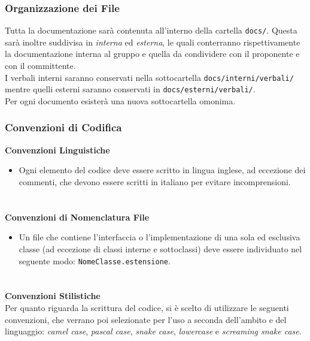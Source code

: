 \documentclass[a4paper, 12pt]{article}
\begin{document}
\subsubsection{Organizzazione dei File}
Tutta la documentazione sarà contenuta all'interno della cartella \texttt{docs/}. Questa sarà inoltre suddivisa in \textit{interna} ed \textit{esterna}, le quali conterranno rispettivamente la documentazione interna al gruppo e quella da condividere con il proponente e con il committente. \\
I verbali interni saranno conservati nella sottocartella \texttt{docs/interni/verbali/} mentre quelli esterni saranno conservati in \texttt{docs/esterni/verbali/}.\\
Per ogni documento esisterà una nuova sottocartella omonima.

\subsubsection{Convenzioni di Codifica}
\textbf{Convenzioni Linguistiche} \newline
\begin{itemize}
    \item Ogni elemento del codice deve essere scritto in lingua inglese, ad eccezione dei commenti, che devono essere scritti in italiano per evitare incomprensioni.
\end{itemize}
\paragraph{}\\
\textbf{Convenzioni di Nomenclatura File}
\begin{itemize}
    \item Un file che contiene l'interfaccia o l'implementazione di una sola ed esclusiva classe (ad eccezione di classi interne e sottoclassi) deve essere individuato nel seguente modo: \texttt{NomeClasse.estensione}.
\end{itemize}
\paragraph{} \\
\textbf{Convenzioni Stilistiche} \\
Per quanto riguarda la scrittura del codice, si è scelto di utilizzare le seguenti convenzioni, che verrano poi selezionate per l'uso a seconda dell'ambito e del linguaggio: \textit{camel case}, \textit{pascal case}, \textit{snake case}, \textit{lowercase} e \textit{screaming snake case}.\\ \\
\end{document}

